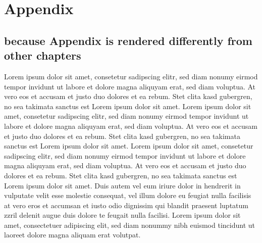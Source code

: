 \documentclass[10pt,twoside,twocolumn,openany,nodeprecatedcode]{dndbook}
\begin{document}
\chapter{Appendix} \label{sec:Appendix}
\section{because Appendix is rendered differently from other chapters} \label{sec:because_Appendix_is_rendered_differently_from_other_chapters}
Lorem ipsum dolor sit amet, consetetur sadipscing elitr, sed diam nonumy eirmod tempor invidunt ut labore et dolore magna aliquyam erat, sed diam voluptua. At vero eos et accusam et justo duo dolores et ea rebum. Stet clita kasd gubergren, no sea takimata sanctus est Lorem ipsum dolor sit amet. Lorem ipsum dolor sit amet, consetetur sadipscing elitr, sed diam nonumy eirmod tempor invidunt ut labore et dolore magna aliquyam erat, sed diam voluptua. At vero eos et accusam et justo duo dolores et ea rebum. Stet clita kasd gubergren, no sea takimata sanctus est Lorem ipsum dolor sit amet. Lorem ipsum dolor sit amet, consetetur sadipscing elitr, sed diam nonumy eirmod tempor invidunt ut labore et dolore magna aliquyam erat, sed diam voluptua. At vero eos et accusam et justo duo dolores et ea rebum. Stet clita kasd gubergren, no sea takimata sanctus est Lorem ipsum dolor sit amet.
Duis autem vel eum iriure dolor in hendrerit in vulputate velit esse molestie consequat, vel illum dolore eu feugiat nulla facilisis at vero eros et accumsan et iusto odio dignissim qui blandit praesent luptatum zzril delenit augue duis dolore te feugait nulla facilisi. Lorem ipsum dolor sit amet, consectetuer adipiscing elit, sed diam nonummy nibh euismod tincidunt ut laoreet dolore magna aliquam erat volutpat.
\end{document}
